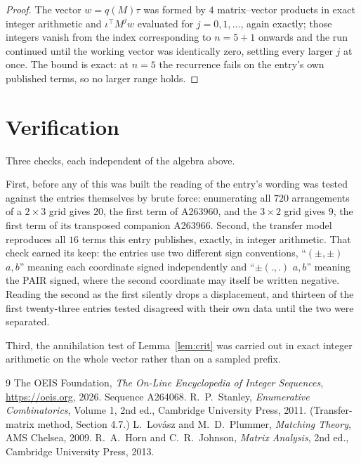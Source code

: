 \documentclass[11pt,a4paper]{article}
\theoremstyle{plain}
\theoremstyle{definition}
\begin{document}
\begin{proof}
The vector $w=q(M)\tau$ was formed by $4$ matrix--vector products in exact integer
arithmetic and $\iota^{\!\top}M^{j}w$ evaluated for $j=0,1,\dots$, again exactly; those
integers vanish from the index corresponding to $n=5+1$ onwards and the run continued
until the working vector was identically zero, settling every larger $j$ at once. The bound is exact: at $n=5$ the recurrence fails on the entry's own published terms, so no larger range holds.
\end{proof}

\section{Verification}

Three checks, each independent of the algebra above.

First, before any of this was built the reading of the entry's wording was tested against the
entries themselves by brute force: enumerating all $720$ arrangements of a $2\times3$ grid
gives $20$, the first term of A263960, and the $3\times2$ grid gives $9$, the first term of its
transposed companion A263966. Second, the transfer model reproduces all $16$ terms this
entry publishes, exactly, in integer arithmetic. That check earned its keep: the entries use
two different sign conventions, ``$(\pm,\pm)$ $a,b$'' meaning each coordinate signed
independently and ``$\pm(.,.)$ $a,b$'' meaning the PAIR signed, where the second coordinate may
itself be written negative. Reading the second as the first silently drops a displacement, and
thirteen of the first twenty-three entries tested disagreed with their own data until the two
were separated.

Third, the annihilation test of Lemma~\ref{lem:crit} was carried out in exact integer
arithmetic on the whole vector rather than on a sampled prefix.

\begin{thebibliography}{9}
 The OEIS Foundation, \emph{The On-Line Encyclopedia of Integer
Sequences}, \url{https://oeis.org}, 2026. Sequence A264068.
 R.~P.~Stanley, \emph{Enumerative Combinatorics}, Volume 1, 2nd ed.,
Cambridge University Press, 2011. (Transfer-matrix method, Section 4.7.)
 L.~Lov\'asz and M.~D.~Plummer, \emph{Matching Theory}, AMS Chelsea, 2009.
 R.~A.~Horn and C.~R.~Johnson, \emph{Matrix Analysis}, 2nd ed., Cambridge
University Press, 2013.
\end{thebibliography}
\end{document}
